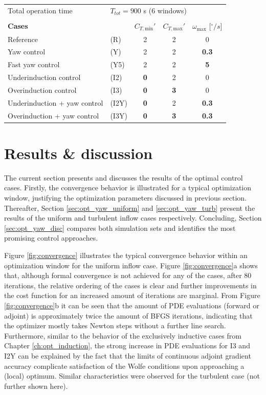 \begin{table}
\begin{tabular}{llccc}
		Total operation time         	& \multicolumn{4}{l}{$T_{tot} = 900$ s (6 windows)}\\
		& & & & \\	
		\textbf{Cases} & \  & $C_{T,\text{min}}'$ & $C_{T,\text{max}}'$ & $\omega_{\text{max}}$ [$^\circ/s$] \\ 
		Reference & (R)    &  2 & 2 & 0   \\ 
		Yaw control & (Y)   &  2 & 2 & \textbf{0.3} \\ 
		Fast yaw control & (Y5)   &  2 & 2 &\textbf{5}   \\ 
		Underinduction control & (I2)    &  \textbf{0} & 2 & 0\\
		Overinduction control & (I3)    &  \textbf{0} & \textbf{3} & 0\\ 
		Underinduction + yaw control & (I2Y)   &  \textbf{0} & 2 & \textbf{0.3} \\ 
		Overinduction + yaw control & (I3Y)   &  \textbf{0} & \textbf{3} & \textbf{0.3} \\ 
		\hline 
	\end{tabular} 
\end{table}









\section{Results \& discussion}\label{sec:opt_yaw_results}
The current section presents and discusses the results of the optimal control cases. Firstly, the convergence behavior is illustrated for a typical optimization window, justifying the optimization parameters discussed in previous section. Thereafter, Section \ref{sec:opt_yaw_uniform} and \ref{sec:opt_yaw_turb} present the results of the uniform and turbulent inflow cases respectively. Concluding, Section \ref{sec:opt_yaw_disc} compares both simulation sets and identifies the most promising control approaches.

Figure \ref{fig:convergence} illustrates the typical convergence behavior within an optimization window for the uniform inflow case. Figure \ref{fig:convergence}a shows that, although formal convergence is not achieved for any of the cases, after 80 iterations, the relative ordering of the cases is clear and further improvements in the cost function for an increased amount of iterations are marginal. From Figure \ref{fig:convergence}b it can be seen that the amount of PDE evaluations (forward or adjoint) is approximately twice the amount of BFGS iterations, indicating that the optimizer mostly takes Newton steps without a further line search. Furthermore, similar to the behavior of the exclusively inductive cases from Chapter \ref{ch:opt_induction}, the strong increase in PDE evaluations for I3 and I2Y can be explained by the fact that the limits of continuous adjoint gradient accuracy complicate satisfaction of the Wolfe conditions upon approaching a (local) optimum. Similar characteristics were observed for the turbulent case (not further shown here).

